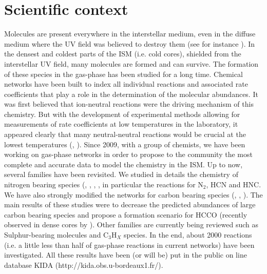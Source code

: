 \section{Scientific context} 

Molecules are present everywhere in the interstellar medium, even in the diffuse medium where the UV field was believed to destroy them (see for instance \cite{2012ApJ...753L..28L}). In the densest and coldest parts of the ISM (i.e. cold cores), shielded from the interstellar UV field, many molecules are formed and can survive. The formation of these species in the gas-phase has been studied for a long time. Chemical networks have been built to index all individual reactions and associated rate coefficients that play a role in the determination of the molecular abundances. It was first believed that ion-neutral reactions were the driving mechanism of this chemistry. But with the development of experimental methods allowing for measurements of rate coefficients at low temperatures in the laboratory, it appeared clearly that many neutral-neutral reactions would be crucial at the lowest temperatures (\cite{2010SSRv..156...13W}, \cite{Smith_2011}). Since 2009, with a group of chemists, we have been working on gas-phase networks in order to propose to the community the most complete and accurate data to model the chemistry in the ISM. Up to now, several families have been revisited. We studied in details the chemistry of nitrogen bearing species (\cite{2013PCCP...1513888D}, \cite{2012PNAS..10910233D}, \cite{2014MNRAS.443..398L}, \cite{2013arXiv1310.4350W}, in particular the reactions  for N$_2$, HCN and HNC. We have also strongly modified the networks for carbon bearing species (\cite{Wakelam_2009}, \cite{2014MNRAS.437..930L}, \cite{2015MNRAS.453L..48W}). The main results of these studies were to decrease the predicted abundances of large carbon bearing species and propose a formation scenario for HCCO (recently observed in dense cores by \cite{Ag_ndez_2015}). Other families are currently being reviewed such as Sulphur-bearing molecules and C$_3$H$_X$ species. In the end, about 2000 reactions (i.e. a little less than half of gas-phase reactions in current networks) have been investigated. All these results have been (or will be) put in the public on line database KIDA (http://kida.obs.u-bordeaux1.fr/). \\
